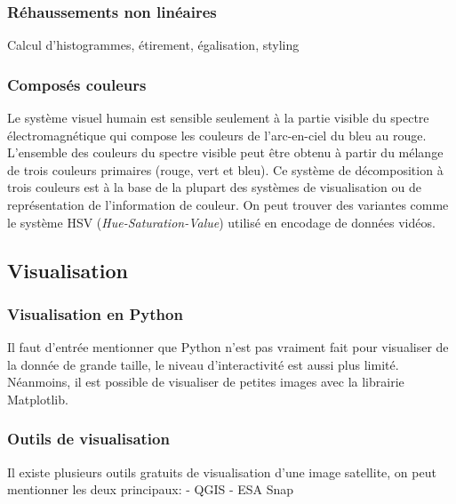 \documentclass[11pt]{article}
\begin{document}
\hypertarget{ruxe9haussements-non-linuxe9aires}{%
\subsubsection{Réhaussements non
linéaires}\label{ruxe9haussements-non-linuxe9aires}}

Calcul d'histogrammes, étirement, égalisation, styling

\hypertarget{composuxe9s-couleurs}{%
\subsubsection{Composés couleurs}\label{composuxe9s-couleurs}}

Le système visuel humain est sensible seulement à la partie visible du
spectre électromagnétique qui compose les couleurs de l'arc-en-ciel du
bleu au rouge. L'ensemble des couleurs du spectre visible peut être
obtenu à partir du mélange de trois couleurs primaires (rouge, vert et
bleu). Ce système de décomposition à trois couleurs est à la base de la
plupart des systèmes de visualisation ou de représentation de
l'information de couleur. On peut trouver des variantes comme le système
HSV (\emph{Hue-Saturation-Value}) utilisé en encodage de données vidéos.

\hypertarget{visualisation}{%
\subsection{Visualisation}\label{visualisation}}

\hypertarget{visualisation-en-python}{%
\subsubsection{Visualisation en Python}\label{visualisation-en-python}}

Il faut d'entrée mentionner que Python n'est pas vraiment fait pour
visualiser de la donnée de grande taille, le niveau d'interactivité est
aussi plus limité. Néanmoins, il est possible de visualiser de petites
images avec la librairie Matplotlib.

\hypertarget{outils-de-visualisation}{%
\subsubsection{Outils de visualisation}\label{outils-de-visualisation}}

Il existe plusieurs outils gratuits de visualisation d'une image
satellite, on peut mentionner les deux principaux: - QGIS - ESA Snap
\end{document}
